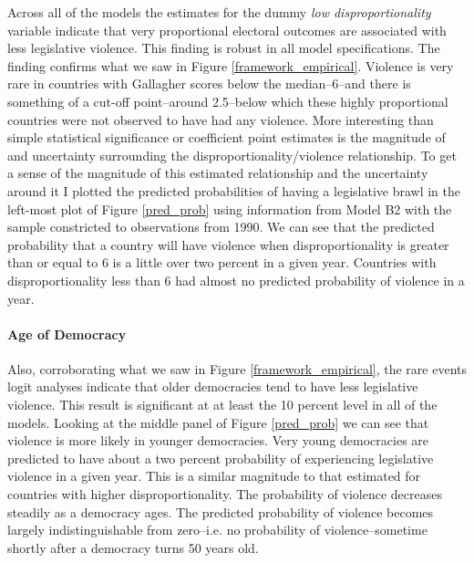 \documentclass[a4paper]{article}\usepackage[]{graphicx}\usepackage[]{color}
\begin{document}
Across all of the models the estimates for the dummy {\emph{low disproportionality}} variable indicate that very proportional electoral outcomes are associated with less legislative violence. This finding is robust in all model specifications. The finding confirms what we saw in Figure \ref{framework_empirical}. Violence is very rare in countries with Gallagher scores below the median--6--and there is something of a cut-off point--around 2.5--below which these highly proportional countries were not observed to have had any violence. More interesting than simple statistical significance or coefficient point estimates is the magnitude of and uncertainty surrounding the disproportionality/violence relationship. To get a sense of the magnitude of this estimated relationship and the uncertainty around it \citep[see][]{King2000} I plotted the predicted probabilities of having a legislative brawl in the left-most plot of Figure \ref{pred_prob} using information from Model B2 with the sample constricted to observations from 1990. We can see that the predicted probability that a country will have violence when disproportionality is greater than or equal to 6 is a little over two percent in a given year. Countries with disproportionality less than 6 had almost no predicted probability of violence in a year.

\paragraph{Age of Democracy}

Also, corroborating what we saw in Figure \ref{framework_empirical}, the rare events logit analyses indicate that older democracies tend to have less legislative violence. This result is significant at at least the 10 percent level in all of the models. Looking at the middle panel of Figure \ref{pred_prob} we can see that violence is more likely in younger democracies. Very young democracies are predicted to have about a two percent probability of experiencing legislative violence in a given year. This is a similar magnitude to that estimated for countries with higher disproportionality. The probability of violence decreases steadily as a democracy ages. The predicted probability of violence becomes largely indistinguishable from zero--i.e. no probability of violence--sometime shortly after a democracy turns 50 years old.
\end{document}
